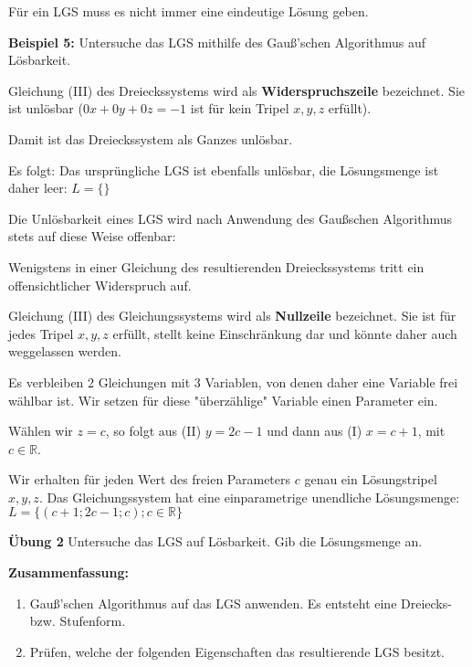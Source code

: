 \documentclass{article}
\begin{document}
Für ein LGS muss es nicht immer eine eindeutige Lösung geben.

\textbf{Beispiel 5:} Untersuche das LGS mithilfe des Gauß'schen Algorithmus auf Lösbarkeit.

\begin{minipage}[t]{0.48\textwidth}
Gleichung (III) des Dreieckssystems wird als \textbf{Widerspruchszeile} bezeichnet. Sie ist unlösbar ($0x + 0y + 0z = -1$ ist für kein Tripel $x, y, z$ erfüllt).

Damit ist das Dreieckssystem als Ganzes unlösbar.

Es folgt: Das ursprüngliche LGS ist ebenfalls unlösbar, die Lösungsmenge ist daher leer: $L = \{\}$

Die Unlösbarkeit eines LGS wird nach Anwendung des Gaußschen Algorithmus stets auf diese Weise offenbar:

Wenigstens in einer Gleichung des resultierenden Dreieckssystems tritt ein offensichtlicher Widerspruch auf.
\end{minipage}%
\hfill%
\begin{minipage}[t]{0.48\textwidth}
Gleichung (III) des Gleichungssystems wird als \textbf{Nullzeile} bezeichnet. Sie ist für jedes Tripel $x, y, z$ erfüllt, stellt keine Einschränkung dar und könnte daher auch weggelassen werden.

Es verbleiben 2 Gleichungen mit 3 Variablen, von denen daher eine Variable frei wählbar ist. Wir setzen für diese "überzählige" Variable einen Parameter ein.

Wählen wir $z = c$, so folgt aus (II) $y = 2c - 1$ und dann aus (I) $x = c + 1$, mit $c \in \mathbb{R}$.

Wir erhalten für jeden Wert des freien Parameters $c$ genau ein Lösungstripel $x, y, z$. Das Gleichungssystem hat eine einparametrige unendliche Lösungsmenge: $L = \{(c + 1; 2c - 1; c); c \in \mathbb{R}\}$
\end{minipage}

\begin{framed}
\textbf{Übung 2} Untersuche das LGS auf Lösbarkeit. Gib die Lösungsmenge an.
\end{framed}

\newpage

\textbf{Zusammenfassung:}

\begin{enumerate}
\item Gauß'schen Algorithmus auf das LGS anwenden. Es entsteht eine Dreiecks- bzw. Stufenform.
\item Prüfen, welche der folgenden Eigenschaften das resultierende LGS besitzt.
\end{enumerate}
\end{document}
